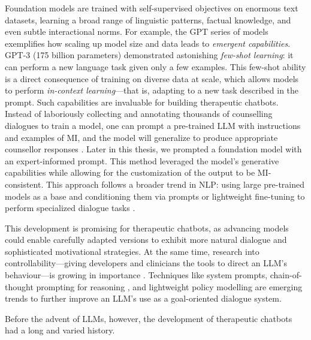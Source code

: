 Foundation models are trained with self-supervised objectives on enormous text datasets, learning a broad range of linguistic patterns, factual knowledge, and even subtle interactional norms. For example, the GPT series of models exemplifies how scaling up model size and data leads to \emph{emergent capabilities}. GPT-3 \cite{brown2020language} (175 billion parameters) demonstrated astonishing \emph{few-shot learning}: it can perform a new language task given only a few examples. This few-shot ability is a direct consequence of training on diverse data at scale, which allows models to perform \emph{in-context learning}—that is, adapting to a new task described in the prompt. Such capabilities are invaluable for building therapeutic chatbots. Instead of laboriously collecting and annotating thousands of counselling dialogues to train a model, one can prompt a pre-trained LLM with instructions and examples of MI, and the model will generalize to produce appropriate counsellor responses \cite{xie-etal-2024-shot-dialogue}. Later in this thesis, we prompted a foundation model with an expert-informed prompt. This method leveraged the model’s generative capabilities while allowing for the customization of the output to be MI-consistent. This approach follows a broader trend in NLP: using large pre-trained models as a base and conditioning them via prompts or lightweight fine-tuning to perform specialized dialogue tasks \cite{10.5555/3600270.3602070}.


This development is promising for therapeutic chatbots, as advancing models could enable carefully adapted versions to exhibit more natural dialogue and sophisticated motivational strategies. At the same time, research into controllability—giving developers and clinicians the tools to direct an LLM’s behaviour—is growing in importance \cite{fernandez-etal-2025-lamia}. Techniques like system prompts, chain-of-thought prompting for reasoning \cite{10.5555/3600270.3602070}, and lightweight policy modelling \cite{du-etal-2024-rewarding} are emerging trends to further improve an LLM’s use as a goal-oriented dialogue system.

Before the advent of LLMs, however, the development of therapeutic chatbots had a long and varied history.

